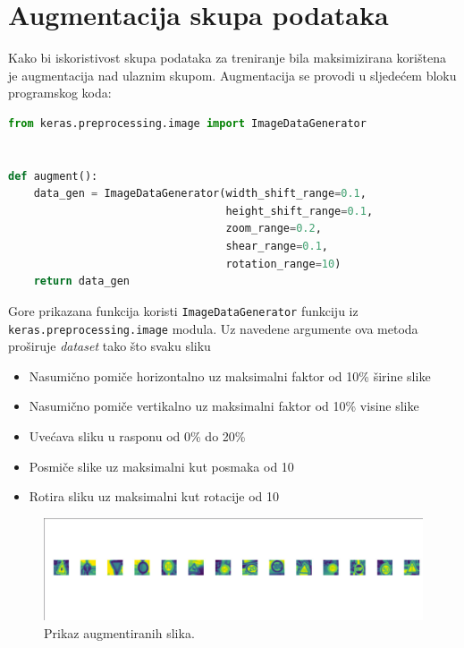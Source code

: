 \documentclass[times, utf8, zavrsni]{fer}
\newcommand{\code}[1]{\colorbox{light-gray}{\texttt{#1}}}
\begin{document}
\section{Augmentacija skupa podataka}
Kako bi iskoristivost skupa podataka za treniranje bila maksimizirana korištena je augmentacija nad ulaznim skupom.
Augmentacija se provodi u sljedećem bloku programskog koda:
\\
\begin{lstlisting}[language=Python]
from keras.preprocessing.image import ImageDataGenerator


def augment():
    data_gen = ImageDataGenerator(width_shift_range=0.1,
                                  height_shift_range=0.1,
                                  zoom_range=0.2,
                                  shear_range=0.1,
                                  rotation_range=10)
    return data_gen
\end{lstlisting}

Gore prikazana funkcija koristi \code{ImageDataGenerator} funkciju iz
\\
\code{keras.preprocessing.image} modula. Uz navedene argumente ova metoda proširuje \emph{dataset} tako što svaku sliku
\begin{itemize}
	\item  Nasumično pomiče horizontalno uz maksimalni faktor od 10\% širine slike
	\item  Nasumično pomiče vertikalno uz maksimalni faktor od 10\% visine slike
	\item  Uvećava sliku u rasponu od 0\% do 20\%
	\item  Posmiče slike uz maksimalni kut posmaka od 10\textdegree 
	\item  Rotira sliku uz maksimalni kut rotacije od 10\textdegree
\end{itemize}
\begin{figure}[h!]
  \includegraphics[width=\linewidth,trim=4 4 4 4,clip]{images/image-augmentation.jpeg}
  \caption{Prikaz augmentiranih slika.}
\end{figure}
\end{document}
